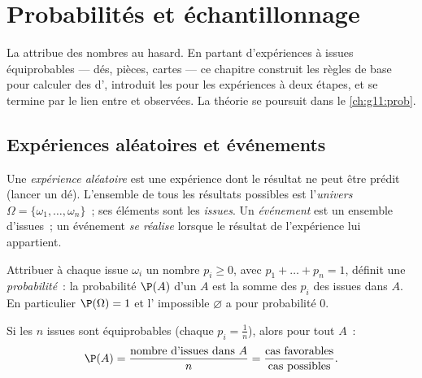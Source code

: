 \chapter{Probabilités et échantillonnage}\label{ch:g10:proba}

La  attribue des nombres au hasard. En partant d'expériences
à issues équiprobables --- dés, pièces, cartes --- ce chapitre construit
les règles de base pour calculer des  d', introduit
les  pour les expériences à deux étapes, et se termine par le lien
entre  et  observées. La théorie se poursuit dans
le \cref{ch:g11:prob}.

\section{Expériences aléatoires et événements}

\begin{definition}\label{def:g10:proba:events}
Une \emph{expérience aléatoire} est une
expérience dont le résultat ne peut être prédit (lancer un dé).
L'ensemble de tous les résultats possibles est l'\emph{univers}
$\Omega = \{\omega_1, \dots, \omega_n\}$~; ses éléments sont les
\emph{issues}. Un \emph{événement} est un ensemble
d'issues~; un événement \emph{se réalise} lorsque le résultat de
l'expérience lui appartient.
\end{definition}

\begin{definition}\label{def:g10:proba:distribution}
Attribuer à chaque issue $\omega_i$ un nombre $p_i \geq 0$, avec
$p_1 + \dots + p_n = 1$, définit une
\emph{probabilité}~: la probabilité $\P(A)$ d'un
 $A$ est la somme des $p_i$ des issues dans $A$. En particulier
$\P(\Omega) = 1$ et l' impossible $\varnothing$ a pour
probabilité $0$.
\end{definition}

\begin{proposition}\label{prop:g10:proba:uniform}
Si les $n$ issues sont équiprobables (chaque $p_i = \frac1n$), alors pour
tout  $A$~:
\[
\P(A) = \frac{\text{nombre d'issues dans } A}{n}
= \frac{\text{cas favorables}}{\text{cas possibles}} .
\]
\end{proposition}

